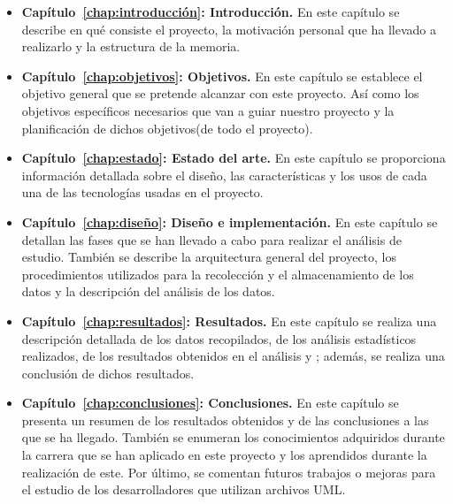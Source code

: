\documentclass[a4paper, 12pt]{book}
\begin{document}
\begin{itemize}
  
  \item \textbf{Capítulo~\ref{chap:introducción}: Introducción.} En este capítulo se describe en qué consiste el proyecto, la motivación personal que ha llevado a realizarlo y la estructura de la memoria. 

  \item \textbf{Capítulo~\ref{chap:objetivos}: Objetivos.} En este capítulo se establece el objetivo general que se pretende alcanzar con este proyecto. 
  Así como los objetivos específicos necesarios que van a guiar nuestro proyecto y la planificación de dichos objetivos(de todo el proyecto). 
  
  \item \textbf{Capítulo~\ref{chap:estado}: Estado del arte.} En este capítulo se proporciona información detallada sobre el diseño, las características y los usos de cada una de las tecnologías usadas en el proyecto.  
  
  \item \textbf{Capítulo~\ref{chap:diseño}: Diseño e implementación.} En este capítulo se detallan las fases que se han llevado a cabo para realizar el análisis de estudio. 
  También se describe la arquitectura general del proyecto, los procedimientos utilizados para la recolección y el almacenamiento de los datos y la descripción del análisis de los datos.

  \item \textbf{Capítulo~\ref{chap:resultados}: Resultados.} En este capítulo se realiza una descripción detallada de los datos recopilados, de los análisis estadísticos realizados, de los resultados obtenidos en el análisis y ; además, se realiza una conclusión de dichos resultados.
 
  \item \textbf{Capítulo~\ref{chap:conclusiones}: Conclusiones.} En este capítulo se presenta un resumen de los resultados obtenidos y de las conclusiones a las que se ha llegado. 
  También se enumeran los conocimientos adquiridos durante la carrera que se han aplicado en este proyecto y los aprendidos durante la realización de este.
  Por último, se comentan futuros trabajos o mejoras para el estudio de los desarrolladores que utilizan archivos UML. 
  
  
\end{itemize}


\end{document}
